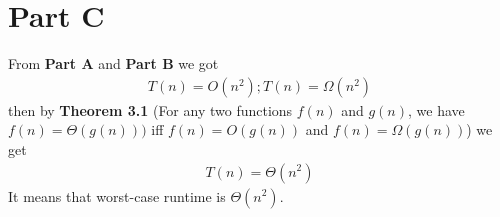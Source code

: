 \documentclass[12pt]{article}
\begin{document}
\section{Part C}
From \textbf{Part A} and \textbf{Part B} we got 
\begin{align}\label{10}
T(n) = O(n ^ 2); T(n) = \Omega (n ^ 2)
\end{align}
then by \textbf{Theorem 3.1} (For any two functions $f(n)$ and $g(n)$, we have $f(n) = \Theta(g(n)))$ iff $f(n) = O(g(n))$ and $f(n) = \Omega (g(n))$) we get
\begin{align}
T(n) = \Theta (n ^ 2)
\end{align}
It means that worst-case runtime is $\Theta (n ^ 2)$.
\end{document}
